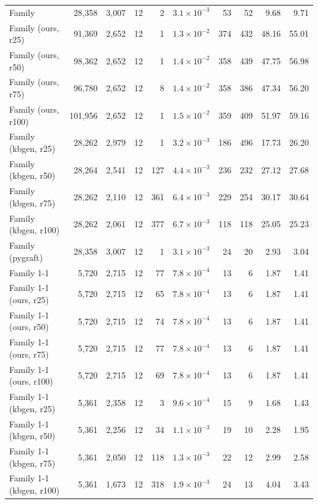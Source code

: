 \begin{tabular}{lrrrrrrrrr}
\midrule
Family & 28{,}358 & 3{,}007 & 12 & 2 & $3.1\times10^{-3}$ & 53 & 52 & 9.68 & 9.71 \\
Family (ours, r25) & 91{,}369 & 2{,}652 & 12 & 1 & $1.3\times10^{-2}$ & 374 & 432 & 48.16 & 55.01 \\
Family (ours, r50) & 98{,}362 & 2{,}652 & 12 & 1 & $1.4\times10^{-2}$ & 358 & 439 & 47.75 & 56.98 \\
Family (ours, r75) & 96{,}780 & 2{,}652 & 12 & 8 & $1.4\times10^{-2}$ & 358 & 386 & 47.34 & 56.20 \\
Family (ours, r100) & 101{,}956 & 2{,}652 & 12 & 1 & $1.5\times10^{-2}$ & 359 & 409 & 51.97 & 59.16 \\
Family (kbgen, r25) & 28{,}262 & 2{,}979 & 12 & 1 & $3.2\times10^{-3}$ & 186 & 496 & 17.73 & 26.20 \\
Family (kbgen, r50) & 28{,}264 & 2{,}541 & 12 & 127 & $4.4\times10^{-3}$ & 236 & 232 & 27.12 & 27.68 \\
Family (kbgen, r75) & 28{,}262 & 2{,}110 & 12 & 361 & $6.4\times10^{-3}$ & 229 & 254 & 30.17 & 30.64 \\
Family (kbgen, r100) & 28{,}262 & 2{,}061 & 12 & 377 & $6.7\times10^{-3}$ & 118 & 118 & 25.05 & 25.23 \\
Family (pygraft) & 28{,}358 & 3{,}007 & 12 & 1 & $3.1\times10^{-3}$ & 24 & 20 & 2.93 & 3.04 \\
\midrule
Family 1-1 & 5{,}720 & 2{,}715 & 12 & 77 & $7.8\times10^{-4}$ & 13 & 6 & 1.87 & 1.41 \\
Family 1-1 (ours, r25) & 5{,}720 & 2{,}715 & 12 & 65 & $7.8\times10^{-4}$ & 13 & 6 & 1.87 & 1.41 \\
Family 1-1 (ours, r50) & 5{,}720 & 2{,}715 & 12 & 74 & $7.8\times10^{-4}$ & 13 & 6 & 1.87 & 1.41 \\
Family 1-1 (ours, r75) & 5{,}720 & 2{,}715 & 12 & 77 & $7.8\times10^{-4}$ & 13 & 6 & 1.87 & 1.41 \\
Family 1-1 (ours, r100) & 5{,}720 & 2{,}715 & 12 & 69 & $7.8\times10^{-4}$ & 13 & 6 & 1.87 & 1.41 \\
Family 1-1 (kbgen, r25) & 5{,}361 & 2{,}358 & 12 & 3 & $9.6\times10^{-4}$ & 15 & 9 & 1.68 & 1.43 \\
Family 1-1 (kbgen, r50) & 5{,}361 & 2{,}256 & 12 & 34 & $1.1\times10^{-3}$ & 19 & 10 & 2.28 & 1.95 \\
Family 1-1 (kbgen, r75) & 5{,}361 & 2{,}050 & 12 & 118 & $1.3\times10^{-3}$ & 22 & 12 & 2.99 & 2.58 \\
Family 1-1 (kbgen, r100) & 5{,}361 & 1{,}673 & 12 & 318 & $1.9\times10^{-3}$ & 24 & 13 & 4.04 & 3.43 \\

\end{tabular}
